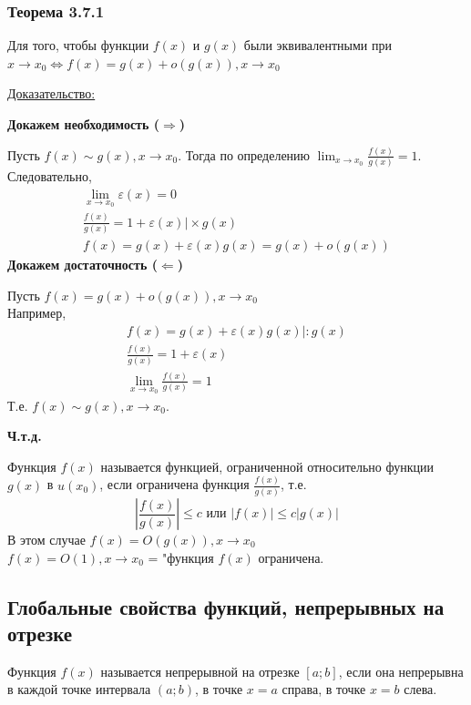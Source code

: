 \documentclass[12pt]{article}
\begin{document}
    \subsubsection*{Теорема 3.7.1}\label{th:3.7.1}
    Для того, чтобы функции $f(x)$ и $g(x)$ были эквивалентными при $x \to x_0 \Leftrightarrow f(x) = g(x) + o(g(x)), x \to x_0$\par\noindent
    \underline{Доказательство:}
    \begin{adjustwidth}{1.5em}{1.5em}
        \textbf{Докажем необходимость ($\Rightarrow$)}\par\noindent
        Пусть $f(x) \sim g(x), x \to x_0$. Тогда по определению $\lim_{x \to x_0}\frac{f(x)}{g(x)} = 1$.\\
        Следовательно, \begin{gather*}
            \lim_{x\to x_0}\varepsilon(x) = 0\\
            \frac{f(x)}{g(x)} = 1 + \varepsilon(x) \Big| \times g(x)\\
            f(x) = g(x) + \varepsilon(x) g(x) = g(x) + o(g(x))
        \end{gather*}\noindent
        \textbf{Докажем достаточность ($\Leftarrow$)}\par\noindent
        Пусть $f(x) = g(x) + o(g(x)), x \to x_0$\\
        Например, 
        \begin{gather*}
            f(x) = g(x) + \varepsilon(x) g(x) \Big| : g(x)\\
            \frac{f(x)}{g(x)} = 1 + \varepsilon(x)\\
            \lim_{x \to x_0} \frac{f(x)}{g(x)} = 1
        \end{gather*}
        Т.е. $f(x) \sim g(x), x \to x_0$.
        \begin{center}
            \textbf{Ч.т.д.}
        \end{center}
    \end{adjustwidth}

    Функция $f(x)$ называется функцией, ограниченной относительно функции $g(x)$ в $u(x_0)$, если ограничена функция $\frac{f(x)}{g(x)}$, т.е.
    \[ \left|\frac{f(x)}{g(x)}\right| \le c \text{ или } \left|f(x)\right| \le c\left|g(x)\right| \]
    В этом случае $f(x) = O(g(x)), x \to x_0$\\
    $f(x) = O(1), x \to x_0$ = "функция $f(x)$ ограничена.
    
    \subsection{Глобальные свойства функций, непрерывных на отрезке}
    \noindent Функция $f(x)$ называется непрерывной на отрезке $[a; b]$, если она непрерывна в каждой точке интервала $(a; b)$, в точке $x = a$ справа, в точке $x = b$ слева.
\end{document}

